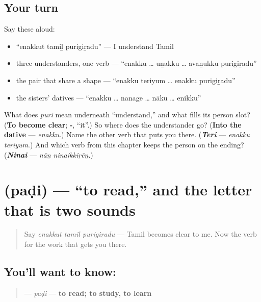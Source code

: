 \subsection*{Your turn}
Say these aloud:

\begin{itemize}
\raggedright
  \item \textquotedblleft{}enakkut tamiḻ purigiṟadu\textquotedblright{} — I understand Tamil
  \item three understanders, one verb — \textquotedblleft{}enakku … uṉakku … avaṉukku purigiṟadu\textquotedblright{}
  \item the pair that share a shape — \textquotedblleft{}enakku teriyum … enakku purigiṟadu\textquotedblright{}
  \item the sisters' datives — \textquotedblleft{}enakku … nanage … nāku … enikku\textquotedblright{}
\end{itemize}

\begin{tcolorbox}[breakable,colback=teal!4,colframe=teal!35!black,title={Before you move on}]
What does \emph{puri} mean underneath \textquotedblleft{}understand,\textquotedblright{} and what fills its person slot? (\textbf{To become clear}; \textbf{-}, \textquotedblleft{}it\textquotedblright{}.) So where does the understander go? (\textbf{Into the dative} — \emph{enakku}.) Name the other verb that puts you there. (\emph{\textbf{Teri}} — \emph{enakku teriyum}.) And which verb from this chapter keeps the person on the ending? (\emph{\textbf{Ninai}} — \emph{nāṉ ninaikkiṟēṉ}.)
\end{tcolorbox}
\section[\texorpdfstring{\ta{படி} (paḍi)}{படி (paḍi)}]{ (paḍi) — \textquotedblleft{}to read,\textquotedblright{} and the letter that is two sounds}

\label{lesson:TA-C33-padi}



\begin{quote}
Say \emph{enakkut tamiḻ purigiṟadu} — Tamil becomes clear to me. Now the verb for the work that gets you there.
\end{quote}

\subsection*{You'll want to know: }
\begin{quote}
\textbf{} — \emph{paḍi} — \textbf{to read; to study, to learn}
\end{quote}


